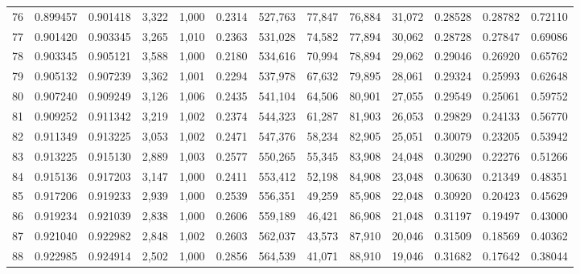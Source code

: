 \begin{tabular}{rrrrrrrrrrrrr}
76  &  0.899457 &  0.901418 &   3,322 &  1,000 &                                     0.2314 &  527,763 &   77,847 &   76,884 &   31,072 &  0.28528 &  0.28782 &  0.72110 \\
77  &  0.901420 &  0.903345 &   3,265 &  1,010 &                                     0.2363 &  531,028 &   74,582 &   77,894 &   30,062 &  0.28728 &  0.27847 &  0.69086 \\
78  &  0.903345 &  0.905121 &   3,588 &  1,000 &                                     0.2180 &  534,616 &   70,994 &   78,894 &   29,062 &  0.29046 &  0.26920 &  0.65762 \\
79  &  0.905132 &  0.907239 &   3,362 &  1,001 &                                     0.2294 &  537,978 &   67,632 &   79,895 &   28,061 &  0.29324 &  0.25993 &  0.62648 \\
80  &  0.907240 &  0.909249 &   3,126 &  1,006 &                                     0.2435 &  541,104 &   64,506 &   80,901 &   27,055 &  0.29549 &  0.25061 &  0.59752 \\
81  &  0.909252 &  0.911342 &   3,219 &  1,002 &                                     0.2374 &  544,323 &   61,287 &   81,903 &   26,053 &  0.29829 &  0.24133 &  0.56770 \\
82  &  0.911349 &  0.913225 &   3,053 &  1,002 &                                     0.2471 &  547,376 &   58,234 &   82,905 &   25,051 &  0.30079 &  0.23205 &  0.53942 \\
83  &  0.913225 &  0.915130 &   2,889 &  1,003 &                                     0.2577 &  550,265 &   55,345 &   83,908 &   24,048 &  0.30290 &  0.22276 &  0.51266 \\
84  &  0.915136 &  0.917203 &   3,147 &  1,000 &                                     0.2411 &  553,412 &   52,198 &   84,908 &   23,048 &  0.30630 &  0.21349 &  0.48351 \\
85  &  0.917206 &  0.919233 &   2,939 &  1,000 &                                     0.2539 &  556,351 &   49,259 &   85,908 &   22,048 &  0.30920 &  0.20423 &  0.45629 \\
86  &  0.919234 &  0.921039 &   2,838 &  1,000 &                                     0.2606 &  559,189 &   46,421 &   86,908 &   21,048 &  0.31197 &  0.19497 &  0.43000 \\
87  &  0.921040 &  0.922982 &   2,848 &  1,002 &                                     0.2603 &  562,037 &   43,573 &   87,910 &   20,046 &  0.31509 &  0.18569 &  0.40362 \\
88  &  0.922985 &  0.924914 &   2,502 &  1,000 &                                     0.2856 &  564,539 &   41,071 &   88,910 &   19,046 &  0.31682 &  0.17642 &  0.38044 \\

\end{tabular}
